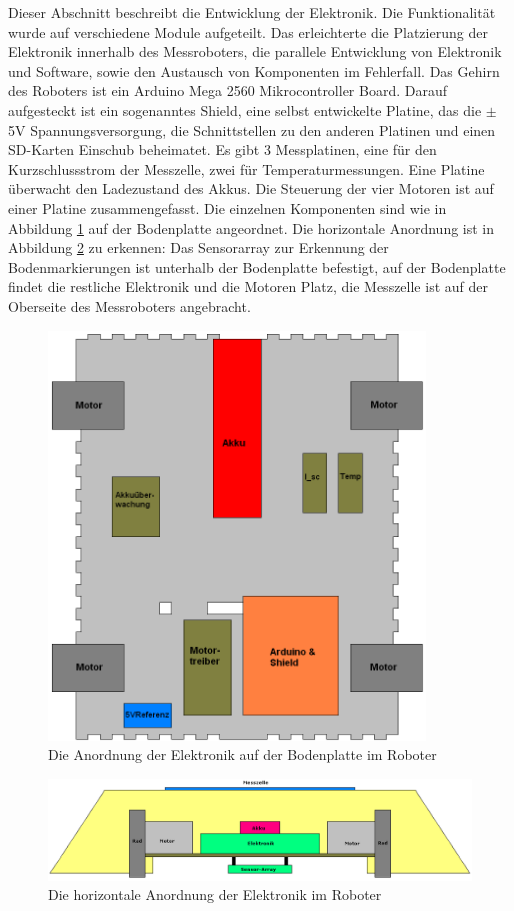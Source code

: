 \documentclass[a4paper,bibtotoc,oneside]{scrbook}
\begin{document}
Dieser Abschnitt beschreibt die Entwicklung der Elektronik. Die Funktionalität wurde auf verschiedene Module aufgeteilt. Das erleichterte die Platzierung der Elektronik innerhalb des Messroboters, die parallele Entwicklung von Elektronik und Software, sowie den Austausch von Komponenten im Fehlerfall. 
Das Gehirn des Roboters ist ein Arduino Mega 2560 Mikrocontroller Board. Darauf aufgesteckt ist ein sogenanntes Shield, eine selbst entwickelte Platine, das die $\pm$5V Spannungsversorgung, die Schnittstellen zu den anderen Platinen und einen SD-Karten Einschub beheimatet.
Es gibt 3 Messplatinen, eine für den Kurzschlussstrom der Messzelle, zwei für Temperaturmessungen. Eine Platine überwacht den Ladezustand des Akkus. Die Steuerung der vier Motoren ist auf einer Platine zusammengefasst.
Die einzelnen Komponenten sind wie in Abbildung \ref{elek} auf der Bodenplatte angeordnet.
Die horizontale Anordnung ist in Abbildung \ref{vorne} zu erkennen: Das Sensorarray zur Erkennung der Bodenmarkierungen ist unterhalb der Bodenplatte befestigt, auf der Bodenplatte findet die restliche Elektronik und die Motoren Platz, die Messzelle ist auf der Oberseite des Messroboters angebracht.
\begin{figure}[htbp]
\centering
\includegraphics[width=100mm]{img/bodenplatte.png}
\caption{Die Anordnung der Elektronik auf der Bodenplatte im Roboter}\label{elek}
\end{figure}
 
\begin{figure}[htbp]
\centering
\includegraphics[width=150mm]{img/vorne.png}
\caption{Die horizontale Anordnung der Elektronik im Roboter}\label{vorne}
\end{figure}
\end{document}

